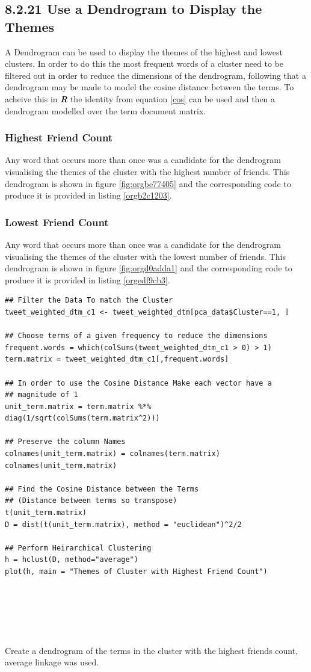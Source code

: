 \documentclass[11pt]{article}
\begin{document}
\subsection{8.2.21 Use a Dendrogram to Display the Themes}
\label{sec:orgd21d011}
A Dendrogram can be used to display the themes of the highest and lowest
clusters. In order to do this the most frequent words of a cluster need to be
filtered out in order to reduce the dimensions of the dendrogram, following that
a dendrogram may be made to model the cosine distance between the terms. To
acheive this in \textbf{\emph{R}} the identity from equation \eqref{cos} can be used and
then a dendrogram modelled over the term document matrix.


\subsubsection{Highest Friend Count}
\label{sec:org5401132}
Any word that occurs more than once was a candidate for the dendrogram visualising the themes of the cluster with the highest number of friends. This dendrogram is shown in figure \ref{fig:orgbe77405} and the corresponding code to produce it is provided in listing \ref{orgb2c1203}.

\subsubsection{Lowest Friend Count}
\label{sec:org5a7b486}
Any word that occurs more than once was a candidate for the dendrogram visualising the themes of the cluster with the lowest number of friends. This dendrogram is shown in figure \ref{fig:orgd0adda1} and the corresponding code to produce it is provided in listing \ref{orgedf9cb3}.

\begin{listing}[htbp]
\begin{verbatim}
## Filter the Data To match the Cluster
tweet_weighted_dtm_c1 <- tweet_weighted_dtm[pca_data$Cluster==1, ]

## Choose terms of a given frequency to reduce the dimensions
frequent.words = which(colSums(tweet_weighted_dtm_c1 > 0) > 1)
term.matrix = tweet_weighted_dtm_c1[,frequent.words]

## In order to use the Cosine Distance Make each vector have a
## magnitude of 1
unit_term.matrix = term.matrix %*% diag(1/sqrt(colSums(term.matrix^2)))

## Preserve the column Names
colnames(unit_term.matrix) = colnames(term.matrix)
colnames(unit_term.matrix)

## Find the Cosine Distance between the Terms
## (Distance between terms so transpose)
t(unit_term.matrix)
D = dist(t(unit_term.matrix), method = "euclidean")^2/2

## Perform Heirarchical Clustering
h = hclust(D, method="average")
plot(h, main = "Themes of Cluster with Highest Friend Count")






\end{verbatim}
\caption{\label{orgb2c1203}Create a dendrogram of the terms in the cluster with the highest friends count, average linkage was used.}
\end{listing}
\end{document}
